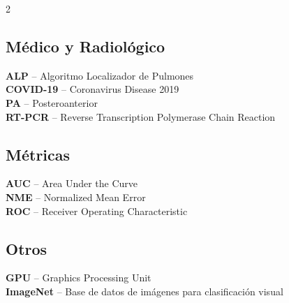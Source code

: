 \begin{multicols}{2}
\subsection*{Médico y Radiológico}
\textbf{ALP} -- Algoritmo Localizador de Pulmones \\
\textbf{COVID-19} -- Coronavirus Disease 2019 \\
\textbf{PA} -- Posteroanterior \\
\textbf{RT-PCR} -- Reverse Transcription Polymerase Chain Reaction

\subsection*{Métricas}
\textbf{AUC} -- Area Under the Curve \\
\textbf{NME} -- Normalized Mean Error \\
\textbf{ROC} -- Receiver Operating Characteristic

\subsection*{Otros}
\textbf{GPU} -- Graphics Processing Unit \\
\textbf{ImageNet} -- Base de datos de imágenes para clasificación visual

\end{multicols}
